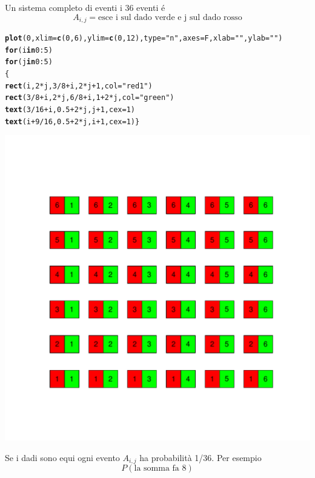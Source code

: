 \documentclass[onecolumn,12pt]{book}\usepackage[]{graphicx}\usepackage[]{color}
\makeatletter
\def\maxwidth{ %
  \ifdim\Gin@nat@width>\linewidth
    \linewidth
  \else
    \Gin@nat@width
  \fi
}
\newcommand{\hlnum}[1]{\textcolor[rgb]{0.686,0.059,0.569}{#1}}%
\newcommand{\hlstr}[1]{\textcolor[rgb]{0.192,0.494,0.8}{#1}}%
\newcommand{\hlopt}[1]{\textcolor[rgb]{0,0,0}{#1}}%
\newcommand{\hlstd}[1]{\textcolor[rgb]{0.345,0.345,0.345}{#1}}%
\newcommand{\hlkwa}[1]{\textcolor[rgb]{0.161,0.373,0.58}{\textbf{#1}}}%
\newcommand{\hlkwc}[1]{\textcolor[rgb]{0.333,0.667,0.333}{#1}}%
\newcommand{\hlkwd}[1]{\textcolor[rgb]{0.737,0.353,0.396}{\textbf{#1}}}%
\newenvironment{kframe}{%
 \def\at@end@of@kframe{}%
 \ifinner\ifhmode%
  \def\at@end@of@kframe{\end{minipage}}%
  \begin{minipage}{\columnwidth}%
 \fi\fi%
 \def\FrameCommand##1{\hskip\@totalleftmargin \hskip-\fboxsep
 \colorbox{shadecolor}{##1}\hskip-\fboxsep
     \hskip-\linewidth \hskip-\@totalleftmargin \hskip\columnwidth}%
 \MakeFramed {\advance\hsize-\width
   \@totalleftmargin\z@ \linewidth\hsize
   \@setminipage}}%
 {\par\unskip\endMakeFramed%
 \at@end@of@kframe}
\newenvironment{knitrout}{}{} %
\makeatother
\begin{document}
Un  sistema completo di eventi i 36 eventi é 
$$A_{i,j}=\textrm{esce i sul dado verde e j sul dado rosso}$$ 
\begin{knitrout}
\color{fgcolor}\begin{kframe}
\begin{alltt}
\hlkwd{plot}\hlstd{(}\hlnum{0}\hlstd{,}\hlkwc{xlim}\hlstd{=}\hlkwd{c}\hlstd{(}\hlnum{0}\hlstd{,}\hlnum{6}\hlstd{),}\hlkwc{ylim}\hlstd{=}\hlkwd{c}\hlstd{(}\hlnum{0}\hlstd{,}\hlnum{12}\hlstd{),}\hlkwc{type}\hlstd{=}\hlstr{"n"}\hlstd{,}\hlkwc{axes}\hlstd{=F,}\hlkwc{xlab}\hlstd{=}\hlstr{""}\hlstd{,}\hlkwc{ylab}\hlstd{=}\hlstr{""}\hlstd{)}
\hlkwa{for} \hlstd{(i} \hlkwa{in} \hlnum{0}\hlopt{:}\hlnum{5}\hlstd{)}
\hlkwa{for} \hlstd{(j} \hlkwa{in} \hlnum{0}\hlopt{:}\hlnum{5}\hlstd{)}
\hlstd{\{}
\hlkwd{rect}\hlstd{(i,}\hlnum{2}\hlopt{*}\hlstd{j,}\hlnum{3}\hlopt{/}\hlnum{8}\hlopt{+}\hlstd{i,}\hlnum{2}\hlopt{*}\hlstd{j}\hlopt{+}\hlnum{1}\hlstd{,}\hlkwc{col}\hlstd{=}\hlstr{"red1"}\hlstd{)}
\hlkwd{rect}\hlstd{(}\hlnum{3}\hlopt{/}\hlnum{8}\hlopt{+}\hlstd{i,}\hlnum{2}\hlopt{*}\hlstd{j,}\hlnum{6}\hlopt{/}\hlnum{8}\hlopt{+}\hlstd{i,}\hlnum{1}\hlopt{+}\hlnum{2}\hlopt{*}\hlstd{j,}\hlkwc{col}\hlstd{=}\hlstr{"green"}\hlstd{)}
\hlkwd{text}\hlstd{(}\hlnum{3}\hlopt{/}\hlnum{16}\hlopt{+}\hlstd{i,}\hlnum{0.5}\hlopt{+}\hlnum{2}\hlopt{*}\hlstd{j,j}\hlopt{+}\hlnum{1}\hlstd{,}\hlkwc{cex}\hlstd{=}\hlnum{1}\hlstd{)}
\hlkwd{text}\hlstd{(i}\hlopt{+}\hlnum{9}\hlopt{/}\hlnum{16}\hlstd{,}\hlnum{0.5}\hlopt{+}\hlnum{2}\hlopt{*}\hlstd{j,i}\hlopt{+}\hlnum{1}\hlstd{,}\hlkwc{cex}\hlstd{=}\hlnum{1}\hlstd{)\}}
\end{alltt}
\end{kframe}
\includegraphics[width=\maxwidth]{figure/unnamed-chunk-5-1} 

\end{knitrout}
Se i dadi sono equi ogni evento  $A_{i,j}$ ha probabilità  1/36. 
Per esempio
$$P(\textrm{la somma fa 8})$$
 
\end{document}
